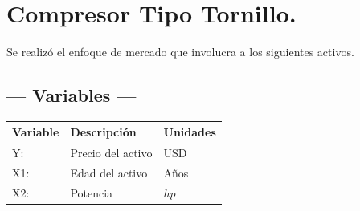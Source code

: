 \section{Compresor Tipo Tornillo.} %
Se realizó el enfoque de mercado que involucra a los siguientes activos.

\subsection{\centering --- Variables ---} %
\begin{center}
  \begin{tabular}{|l|l|l|}
    \hline 
    Variable & Descripción   & Unidades\\ \hline 
    Y:  & Precio del activo  & USD \\ \hline 
    X1: & Edad del activo    & Años \\ \hline 
		X2: & Potencia  & \(hp\) \\ \hline 
  \end{tabular}
\end{center} 


